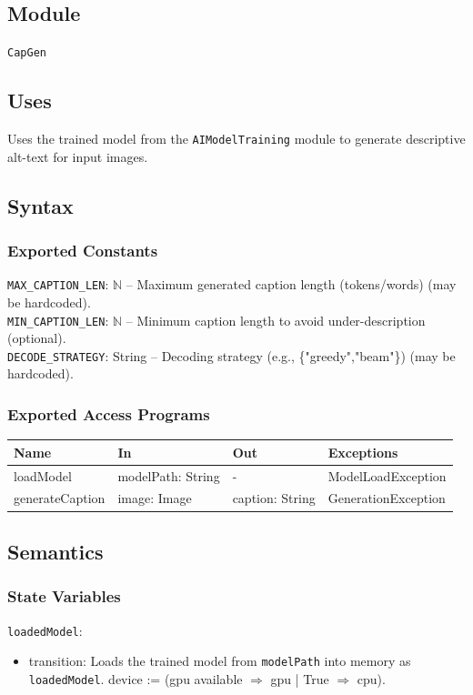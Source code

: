 \documentclass[12pt, titlepage]{article}
\begin{document}
\subsection{Module}
\texttt{CapGen}

\subsection{Uses}
Uses the trained model from the \texttt{AIModelTraining} module to generate descriptive alt-text for input images.

\subsection{Syntax}

\subsubsection{Exported Constants}
\texttt{MAX\_CAPTION\_LEN}: $\mathbb{N}$ -- Maximum generated caption length (tokens/words) (may be hardcoded).\\
\texttt{MIN\_CAPTION\_LEN}: $\mathbb{N}$ -- Minimum caption length to avoid under-description (optional).\\
\texttt{DECODE\_STRATEGY}: String -- Decoding strategy (e.g., \{"greedy","beam"\}) (may be hardcoded).\\

\subsubsection{Exported Access Programs}

\begin{center}
  \begin{tabular}{p{3cm} p{3.5cm} p{4cm} p{4cm}}
\hline
\textbf{Name} & \textbf{In} & \textbf{Out} & \textbf{Exceptions} \\
\hline
loadModel & modelPath: String & - & ModelLoadException \\
\hline
generateCaption & image: Image & caption: String & GenerationException \\
\hline
\end{tabular}
\end{center}

\subsection{Semantics}

\subsubsection{State Variables}
\texttt{loadedModel}: 
\begin{itemize}
\item transition: Loads the trained model from \texttt{modelPath} into memory as \texttt{loadedModel}. device := (gpu available $\Rightarrow$ gpu | True $\Rightarrow$ cpu).
\end{itemize}
\end{document}
